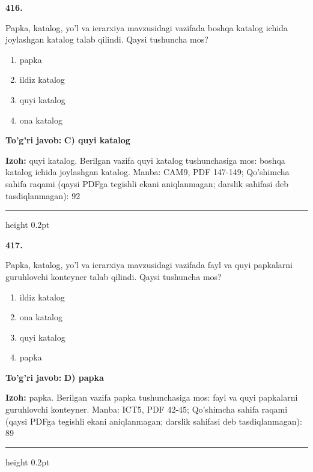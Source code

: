 \documentclass[10pt,a4paper]{article}
\begin{document}
{\bfseries\sffamily\color{ink} 416.}
\par
Papka, katalog, yo'l va ierarxiya mavzusidagi vazifada boshqa katalog ichida joylashgan katalog talab qilindi. Qaysi tushuncha mos?
\begin{enumerate}[label=\Alph*),leftmargin=9mm]
\item papka
\item ildiz katalog
\item quyi katalog
\item ona katalog
\end{enumerate}
\begin{tcolorbox}[enhanced,breakable,colback=teal!4,colframe=teal!60!black,boxrule=0.45pt,arc=1.2mm,left=2.7mm,right=2.7mm,top=1.8mm,bottom=1.8mm,before skip=2mm,after skip=2mm]
{\bfseries\sffamily\color{teal}To'g'ri javob:} \textbf{C) quyi katalog}
\par\smallskip
{\bfseries Izoh:} quyi katalog. Berilgan vazifa quyi katalog tushunchasiga mos: boshqa katalog ichida joylashgan katalog. Manba: CAM9, PDF 147-149; Qo'shimcha sahifa raqami (qaysi PDFga tegishli ekani aniqlanmagan; darslik sahifasi deb tasdiqlanmagan): 92
\end{tcolorbox}
\vspace{2mm}\hrule height 0.2pt\vspace{3mm}

{\bfseries\sffamily\color{ink} 417.}
\par
Papka, katalog, yo'l va ierarxiya mavzusidagi vazifada fayl va quyi papkalarni guruhlovchi konteyner talab qilindi. Qaysi tushuncha mos?
\begin{enumerate}[label=\Alph*),leftmargin=9mm]
\item ildiz katalog
\item ona katalog
\item quyi katalog
\item papka
\end{enumerate}
\begin{tcolorbox}[enhanced,breakable,colback=teal!4,colframe=teal!60!black,boxrule=0.45pt,arc=1.2mm,left=2.7mm,right=2.7mm,top=1.8mm,bottom=1.8mm,before skip=2mm,after skip=2mm]
{\bfseries\sffamily\color{teal}To'g'ri javob:} \textbf{D) papka}
\par\smallskip
{\bfseries Izoh:} papka. Berilgan vazifa papka tushunchasiga mos: fayl va quyi papkalarni guruhlovchi konteyner. Manba: ICT5, PDF 42-45; Qo'shimcha sahifa raqami (qaysi PDFga tegishli ekani aniqlanmagan; darslik sahifasi deb tasdiqlanmagan): 89
\end{tcolorbox}
\vspace{2mm}\hrule height 0.2pt\vspace{3mm}
\end{document}
